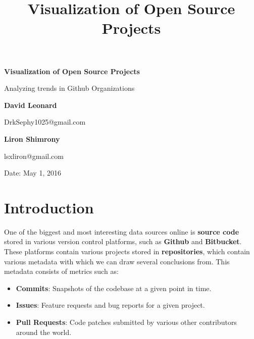 \documentclass{article}
\title{Visualization of Open Source Projects}
\begin{document}
\begin{titlepage}
    \begin{center}
        \vspace*{2.5cm}
        {\bf Visualization of Open Source Projects}
        
        \vspace{0.5cm}
        
        Analyzing trends in Github Organizations

        
        \vspace{4.0cm}        
        
        \textbf{David Leonard}
        
        \vspace{0.5cm}
        DrkSephy1025@gmail.com
        
        \vspace{3.0cm}
        
        \textbf{Liron Shimrony}
        \vspace{0.5cm}
        
        lsxliron@gmail.com
        
	
	\vspace{2.5cm} 
	Date: May 1, 2016
        
        \vspace{1in}
        \vfill
        
    \end{center}
\end{titlepage}

\tableofcontents

\newpage

\section {Introduction}

One of the biggest and most interesting data sources online is \textbf{source code} stored in various version control platforms, such as \textbf{Github} and \textbf{Bitbucket}. These platforms contain various projects stored in \textbf{repositories}, which contain various metadata with which we can draw several conclusions from. This metadata consists of metrics such as:

\begin{itemize}
	\item \textbf{Commits}: Snapshots of the codebase at a given point in time.
	\item \textbf{Issues}: Feature requests and bug reports for a given project.
	\item \textbf{Pull Requests}: Code patches submitted by various other contributors  around the world.
\end{itemize}
\end{document}
